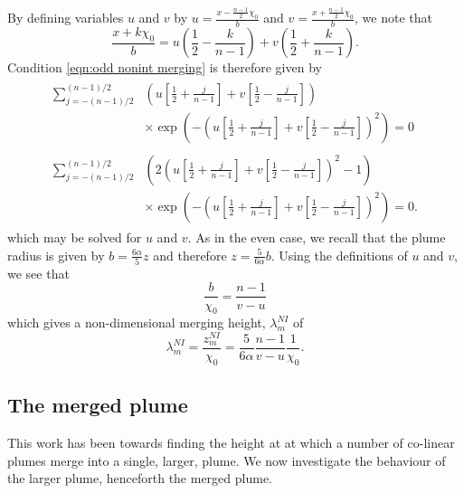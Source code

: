 \documentclass{jfm}
\begin{document}
	By defining variables $u$ and $v$ by $\displaystyle{u = \frac{x - \frac{n-1}{2}\chi_0}{b}}$ and $\displaystyle{v = \frac{x + \frac{n-1}{2}\chi_0}{b}}$, we note that
	\begin{equation}
	\frac{x + k\chi_0}{b} = u\left(\frac{1}{2} - \frac{k}{n-1}\right) + v\left(\frac{1}{2} + \frac{k}{n-1}\right).
	\end{equation}
	Condition \eqref{eqn:odd nonint merging} is therefore given by
	\begin{align}
		\begin{split} \label{eqn:general dEdx odd non-interacting}
		\sum_{j = -(n-1)/2}^{(n-1)/2} &\left(u\left[\frac{1}{2} + \frac{j}{n-1}\right] + v\left[\frac{1}{2} - \frac{j}{n-1}\right]\right) \\
		&\times\exp\left(-\left(u\left[\frac{1}{2} + \frac{j}{n-1}\right] + v\left[\frac{1}{2} - \frac{j}{n-1}\right]\right)^2 \right) = 0
		\end{split} \\
		\begin{split} \label{eqn:general d2Edx2 odd non-interacting}
		\sum_{j = -(n-1)/2}^{(n-1)/2} &\left(2\left(u\left[\frac{1}{2} + \frac{j}{n-1}\right] + v\left[\frac{1}{2} - \frac{j}{n-1}\right]\right)^2 - 1\right) \\
		&\times\exp\left(-\left(u\left[\frac{1}{2} + \frac{j}{n-1}\right] + v\left[\frac{1}{2} - \frac{j}{n-1}\right]\right)^2 \right) = 0.
		\end{split}
	\end{align}
	which may be solved for $u$ and $v$.
	As in the even case, we recall that the plume radius is given by $b = \tfrac{6\alpha}{5}z$ and therefore $z = \frac{5}{6\alpha}b$. Using the definitions of $u$ and $v$, we see that 
	\begin{equation}
		\frac{b}{\chi_0} = \frac{n-1}{v-u}
	\end{equation}
	which gives a non-dimensional merging height, $\lambda_m^{NI}$ of
	\begin{equation}
		\lambda_m^{NI} = \frac{z_m^{NI}}{\chi_0} = \frac{5}{6\alpha} \frac{n-1}{v - u}\frac{1}{\chi_0}.
	\end{equation}
	\subsection{The merged plume}
	This work has been towards finding the height at at which a number of co-linear plumes merge into a single, larger, plume. We now investigate the behaviour of the larger plume, henceforth the merged plume.
	
\end{document}
